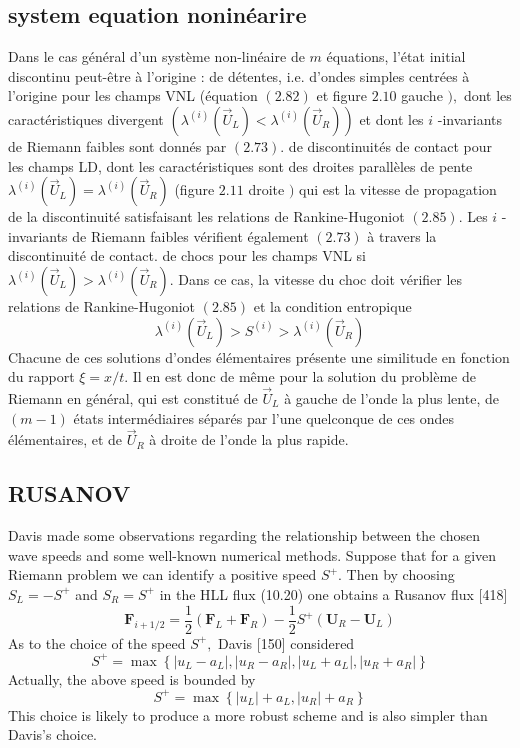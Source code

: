 \subsection{system equation noninéarire}

Dans le cas général d'un système non-linéaire de $m$ équations, l'état initial discontinu peut-être à l'origine :
de détentes, i.e. d'ondes simples centrées à l'origine pour les champs VNL (équation $(2.82)$ et figure $2.10$ gauche $),$ dont les caractéristiques divergent $\left(\lambda^{(i)}\left(\vec{U}_{L}\right)<\lambda^{(i)}\left(\vec{U}_{R}\right)\right)$ et dont les $i$ -invariants de Riemann faibles sont donnés par $(2.73)$. de discontinuités de contact pour les champs LD, dont les caractéristiques sont des droites parallèles de pente $\lambda^{(i)}\left(\vec{U}_{L}\right)=\lambda^{(i)}\left(\vec{U}_{R}\right)$ (figure $2.11$ droite $)$ qui est la vitesse de propagation de la discontinuité satisfaisant les relations de Rankine-Hugoniot $(2.85)$. Les $i$ -invariants de Riemann faibles vérifient également $(2.73)$ à travers la discontinuité de contact. de chocs pour les champs VNL si $\lambda^{(i)}\left(\vec{U}_{L}\right)>\lambda^{(i)}\left(\vec{U}_{R}\right) .$ Dans ce cas, la vitesse $\mathrm{du}$ choc doit vérifier les relations de Rankine-Hugoniot $(2.85)$ et la condition entropique
$$
\lambda^{(i)}\left(\vec{U}_{L}\right)>S^{(i)}>\lambda^{(i)}\left(\vec{U}_{R}\right)
$$
Chacune de ces solutions d'ondes élémentaires présente une similitude en fonction $\mathrm{du}$ rapport $\xi=x / t$. Il en est donc de même pour la solution du problème de Riemann en général, qui est constitué de $\vec{U}_{L}$ à gauche de l'onde la plus lente, de $(m-1)$ états intermédiaires séparés par l'une quelconque de ces ondes élémentaires, et de $\vec{U}_{R}$ à droite de l'onde la plus rapide.

\subsection{RUSANOV}

Davis made some observations regarding the relationship between the chosen wave speeds and some well-known numerical methods. Suppose that for a given Riemann problem we can identify a positive speed $S^{+}$. Then by choosing $S_{L}=-S^{+}$ and $S_{R}=S^{+}$ in the HLL flux (10.20) one obtains a Rusanov flux [418]
$$
\mathbf{F}_{i+1 / 2}=\frac{1}{2}\left(\mathbf{F}_{L}+\mathbf{F}_{R}\right)-\frac{1}{2} S^{+}\left(\mathbf{U}_{R}-\mathbf{U}_{L}\right)
$$
As to the choice of the speed $S^{+},$ Davis [150] considered
$$
S^{+}=\max \left\{\left|u_{L}-a_{L}\right|,\left|u_{R}-a_{R}\right|,\left|u_{L}+a_{L}\right|,\left|u_{R}+a_{R}\right|\right\}
$$
Actually, the above speed is bounded by
$$
S^{+}=\max \left\{\left|u_{L}\right|+a_{L},\left|u_{R}\right|+a_{R}\right\}
$$
This choice is likely to produce a more robust scheme and is also simpler than Davis's choice.

